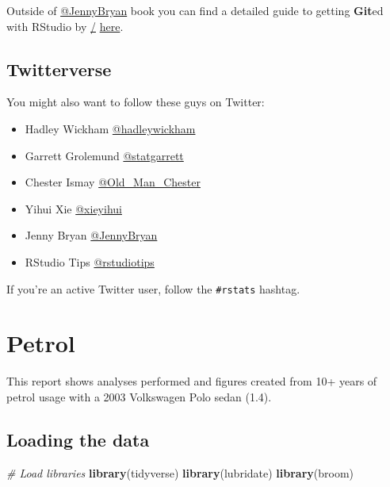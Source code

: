 \documentclass[]{book}
\newenvironment{Shaded}{\begin{snugshade}}{\end{snugshade}}
\newcommand{\KeywordTok}[1]{\textcolor[rgb]{0.13,0.29,0.53}{\textbf{{#1}}}}
\newcommand{\CommentTok}[1]{\textcolor[rgb]{0.56,0.35,0.01}{\textit{{#1}}}}
\newcommand{\NormalTok}[1]{{#1}}
\providecommand{\tightlist}{%
  \setlength{\itemsep}{0pt}\setlength{\parskip}{0pt}}
\theoremstyle{definition}
\theoremstyle{definition}
\theoremstyle{remark}
\begin{document}
Outside of \href{https://twitter.com/JennyBryan}{@JennyBryan} book you
can find a detailed guide to getting \textbf{Git}ed with RStudio by
\href{https://twitter.com/juliesquid}{/\citet{juliesquid}}
\href{http://jules32.github.io/2016-07-12-Oxford/git/}{here}.

\section{Twitterverse}\label{twitterverse}

You might also want to follow these guys on Twitter:

\begin{itemize}
\tightlist
\item
  Hadley Wickham
  \href{https://twitter.com/hadleywickham}{@hadleywickham}
\item
  Garrett Grolemund \href{https://twitter.com/statgarrett}{@statgarrett}
\item
  Chester Ismay
  \href{https://twitter.com/old_man_chester}{@Old\_Man\_Chester}
\item
  Yihui Xie \href{https://twitter.com/xieyihui}{@xieyihui}
\item
  Jenny Bryan \href{https://twitter.com/JennyBryan}{@JennyBryan}
\item
  RStudio Tips \href{https://twitter.com/rstudiotips}{@rstudiotips}
\end{itemize}

If you're an active Twitter user, follow the \texttt{\#rstats} hashtag.

\chapter{Petrol}\label{petrol}

This report shows analyses performed and figures created from 10+ years
of petrol usage with a 2003 Volkswagen Polo sedan (1.4).

\section{Loading the data}\label{loading-the-data}

\begin{Shaded}
\begin{Highlighting}[]
\CommentTok{# Load libraries}
\KeywordTok{library}\NormalTok{(tidyverse)}
\KeywordTok{library}\NormalTok{(lubridate)}
\KeywordTok{library}\NormalTok{(broom)}
\end{Highlighting}
\end{Shaded}
\end{document}
